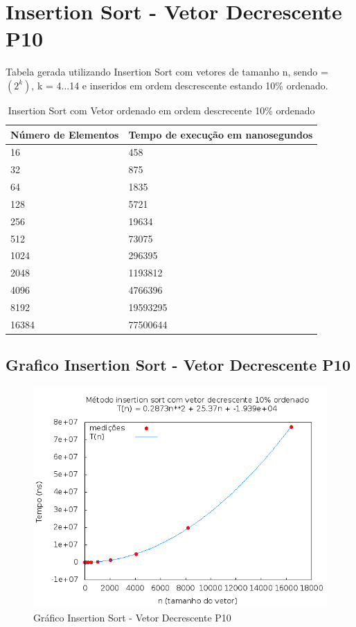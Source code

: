 \documentclass[12pt,a4paper,twoside]{report}
\begin{document}
\section{Insertion Sort - Vetor Decrescente P10}
Tabela gerada utilizando Insertion Sort com vetores de tamanho n, sendo = $(2^k)$, k = 4...14 e inseridos em ordem descrescente estando 10\% ordenado.

\begin{table}[H]
\centering
\caption{Insertion Sort com Vetor ordenado em ordem descrecente 10\% ordenado}
\label{my-label}
\begin{tabular}{|l|l|}
\hline
\multicolumn{1}{|c|}{\textbf{Número de Elementos}} & \multicolumn{1}{c|}{\textbf{Tempo de execução em nanosegundos}} \\ \hline
16 & 458 \\ \hline
32 & 875 \\ \hline
64 & 1835 \\ \hline
128 & 5721 \\ \hline
256 & 19634 \\ \hline
512 & 73075 \\ \hline
1024 & 296395 \\ \hline
2048 & 1193812 \\ \hline
4096 & 4766396 \\ \hline
8192 & 19593295 \\ \hline
16384 & 77500644 \\ \hline
\end{tabular}
\end{table}

\subsection{Grafico Insertion Sort - Vetor Decrescente P10}
\begin{figure}[H]
    \centering
    \includegraphics[width=0.7\linewidth]{graficos/Insertion/vIntDecrescenteP10/vIntDecrescenteP10.png}
  \caption{Gráfico Insertion Sort - Vetor Decrescente P10}
\end{figure}
\end{document}
